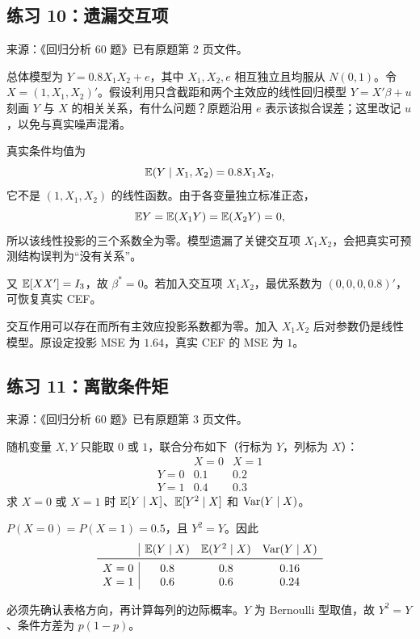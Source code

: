 \subsection*{练习 10：遗漏交互项}
\begin{homework}[练习 10]
\textsf{来源：《回归分析 60 题》已有原题第 2 页文件。}\par
总体模型为 $Y=0.8X_1X_2+e$，其中 $X_1,X_2,e$ 相互独立且均服从 $N(0,1)$。令 $X=(1,X_1,X_2)'$。假设利用只含截距和两个主效应的线性回归模型 $Y=X'\beta+u$ 刻画 $Y$ 与 $X$ 的相关关系，有什么问题？原题沿用 $e$ 表示该拟合误差；这里改记 $u$，以免与真实噪声混淆。
\end{homework}
\begin{solution}
真实条件均值为
\[
\mathbb{E}(Y\mid X_1,X_2)=0.8X_1X_2,
\]
它不是 $(1,X_1,X_2)$ 的线性函数。由于各变量独立标准正态，
\[
\mathbb{E} Y=\mathbb{E}(X_1Y)=\mathbb{E}(X_2Y)=0,
\]
所以该线性投影的三个系数全为零。模型遗漏了关键交互项 $X_1X_2$，会把真实可预测结构误判为“没有关系”。\par 又 $\mathbb{E}[XX']=I_3$，故 $\beta^*=0$。若加入交互项 $X_1X_2$，最优系数为 $(0,0,0,0.8)'$，可恢复真实 CEF。
\end{solution}
\begin{dxtips}[遗漏交互项]\label{hw:reg:tip:10}
交互作用可以存在而所有主效应投影系数都为零。加入 $X_1X_2$ 后对参数仍是线性模型。原设定投影 MSE 为 $1.64$，真实 CEF 的 MSE 为 $1$。
\end{dxtips}

\subsection*{练习 11：离散条件矩}
\begin{homework}[练习 11]
\textsf{来源：《回归分析 60 题》已有原题第 3 页文件。}\par
随机变量 $X,Y$ 只能取 $0$ 或 $1$，联合分布如下（行标为 $Y$，列标为 $X$）：
\[\begin{array}{c|cc}&X=0&X=1\\\hline Y=0&0.1&0.2\\Y=1&0.4&0.3\end{array}\]
求 $X=0$ 或 $X=1$ 时 $\mathbb{E}[Y\mid X]$、$\mathbb{E}[Y^2\mid X]$ 和 $\operatorname{Var}(Y\mid X)$。
\end{homework}
\begin{solution}
$P(X=0)=P(X=1)=0.5$，且 $Y^2=Y$。因此
\[
\begin{array}{c|ccc}
&\E(Y\mid X)&\E(Y^2\mid X)&\Var(Y\mid X)\\\midrule
X=0&0.8&0.8&0.16\\
X=1&0.6&0.6&0.24
\end{array}
\]
\end{solution}
\begin{dxtips}[离散条件矩]\label{hw:reg:tip:11}
必须先确认表格方向，再计算每列的边际概率。$Y$ 为 Bernoulli 型取值，故 $Y^2=Y$、条件方差为 $p(1-p)$。
\end{dxtips}

